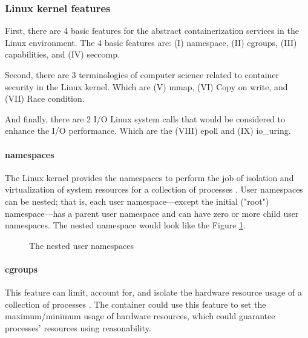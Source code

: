 \documentclass[12pt,a4paper]{article}
\begin{document}
\subsubsection{Linux kernel features}
First, there are 4 basic features for the abstract containerization services in the Linux
environment.
The 4 basic features are: (\RN{1}) namespace, (\RN{2}) cgroups, (\RN{3}) capabilities,
and (\RN{4}) seccomp.

Second, there are 3 terminologies of computer science related to container security in
the Linux kernel. Which are (\RN{5}) mmap, (\RN{6}) Copy on write, and (\RN{7}) Race condition.

And finally, there are 2 I/O Linux system calls that would be considered to enhance the I/O performance.
Which are the (\RN{8}) epoll and (\RN{9}) io\_uring.

\paragraph{namespaces}
The Linux kernel provides the namespaces to perform the job of isolation and virtualization
of system resources for a collection of processes \cite{Road_Ahead}.
User namespaces can be nested; that is, each user namespace—except the initial ("root")
namespace—has a parent user namespace and can have zero or more child user namespaces.
\cite{user_namespaces}
The nested namespace would look like the Figure \ref*{Nested}.
\begin{figure}
  \centering
  \caption[]{The nested user namespaces}
  \label{Nested}
\end{figure}

\paragraph{cgroups}
This feature can limit, account for, and isolate the hardware resource usage of a
collection of processes \cite{cgroup_wiki}.
The container could use this feature to set the maximum/minimum usage of hardware
resources, which could guarantee processes' resources using reasonability.
\end{document}
